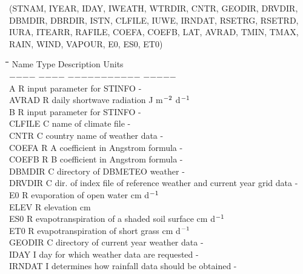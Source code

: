 \documentclass[11pt]{article}
\begin{document}
\begin{indenting}{3.81cm}
(STNAM, IYEAR, IDAY, IWEATH, WTRDIR, CNTR, GEODIR, DRVDIR, DBMDIR,
DBRDIR, ISTN, CLFILE, IUWE, IRNDAT, RSETRG, RSETRD, IURA, ITEARR, RAFILE,
COEFA, COEFB, LAT, AVRAD, TMIN, TMAX, RAIN, WIND, VAPOUR, E0, ES0, ET0)
\end{indenting}
\nwln
\begin{tabbing}
\hspace{1.27cm}\=\hspace{1.27cm}\=\hspace{1.27cm}\=\hspace{1.27cm}\=%
\hspace{1.27cm}\=\hspace{1.27cm}\=\hspace{1.27cm}\=\hspace{1.27cm}\=%
\hspace{1.27cm}\=\hspace{1.27cm}\=\kill
Name    \> \> Type   \> Description                                        \> \> \> \> \> \> \> Units\\
$-$$-$$-$$-$    \> \> $-$$-$$-$$-$   \> $-$$-$$-$$-$$-$$-$$-$$-$$-$$-$$-$                                        \> \> \> \> \> \> \> $-$$-$$-$$-$$-$\\
A\> \> R\> input parameter for STINFO\> \> \> \> \> \> \> -\\
AVRAD\> \> R\> daily shortwave radiation\> \> \> \> \> \> \> J m$^{{\rm -2}}$ d$^{{\rm -1}}$\\
B\> \> R\> input parameter for STINFO\> \> \> \> \> \> \> -\\
CLFILE\> \> C\> name of climate file\> \> \> \> \> \> \> -\\
CNTR\> \> C\> country name of weather data\> \> \> \> \> \> \> -\\
COEFA\> \> R\> A coefficient in Angstrom formula\> \> \> \> \> \> \> -\\
COEFB\> \> R\> B coefficient in Angstrom formula\> \> \> \> \> \> \> -\\
DBMDIR\> \> C\> directory of DBMETEO weather\> \> \> \> \> \> \> -\\
DRVDIR\> \> C\> dir. of index file of reference weather and current year grid data \> \> \> \> \> \> \> -\\
E0\> \> R\> evaporation of open water\> \> \> \> \> \> \> cm d$^{{\rm -1}}$\\
ELEV\> \> R\> elevation\> \> \> \> \> \> \> cm\\
ES0\> \> R\> evapotranspiration of a shaded soil surface\> \> \> \> \> \> \> cm d$^{{\rm -1}}$\\
ET0\> \> R\> evapotranspiration of short grass\> \> \> \> \> \> \> cm d$^{{\rm -1}}$\\
GEODIR\> \> C\> directory of current year weather data\> \> \> \> \> \> \> -\\
IDAY\> \> I\> day for which weather data are requested\> \> \> \> \> \> \> -\\
IRNDAT\> \> I\> determines how rainfall data should be obtained\> \> \> \> \> \> \> -
\end{tabbing}
\end{document}
